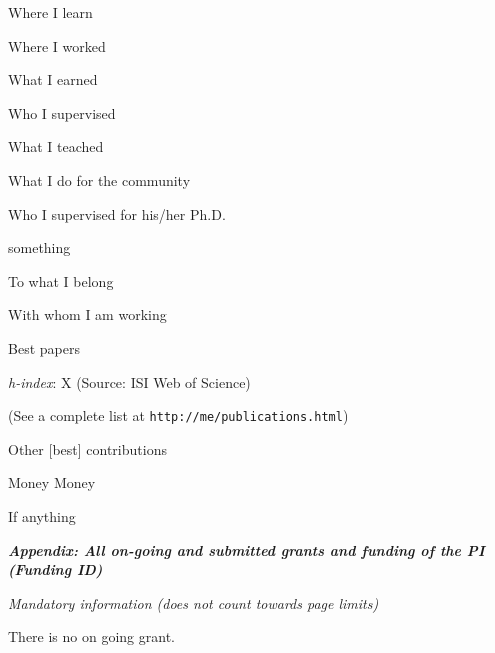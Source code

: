 
Where I learn



Where I worked




What I earned


Who I supervised





What I teached



What I do for the community



Who I supervised for his/her Ph.D.



something


To what I belong


With whom I am working




Best papers


{\it h-index}: X (Source: ISI Web of Science)


({\small See a complete list at \tt http://me/publications.html})




Other [best] contributions


Money Money



If anything

\clearpage

\begin{center}
\textit{\textbf{Appendix: All on-going and submitted grants and funding of the PI (Funding ID)}}

{\it Mandatory information (does not count towards page limits)}\\


\vspace{1in}

There is no on going grant.
\end{center}

